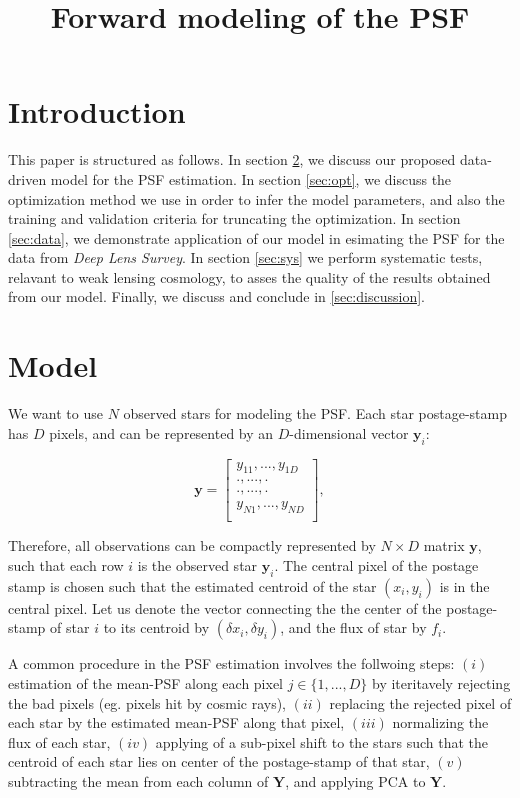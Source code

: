\documentclass[12pt,preprint]{aastex}
\newcommand{\beq}{\begin{equation}}
\newcommand{\eeq}{\end{equation}}
\begin{document}
\title{Forward modeling of the PSF}
\section{Introduction}

This paper is structured as follows. In section \ref{sec:model},
we discuss our proposed data-driven model for the PSF estimation.
In section \ref{sec:opt}, we discuss the optimization method
 we use in order to infer the model parameters, and also
 the training and validation criteria for 
truncating the optimization. In section \ref{sec:data},
 we demonstrate application of our model in esimating
 the PSF for the data from \emph{Deep Lens Survey}. 
In section \ref{sec:sys} we perform systematic tests,
 relavant to weak lensing cosmology, 
to asses the quality of the results obtained from our model. 
Finally, we discuss and conclude in \ref{sec:discussion}.               

\section{Model}\label{sec:model}

We want to use $N$ observed stars for modeling the PSF. 
Each star postage-stamp has $D$ pixels, 
and can be represented by an $D$-dimensional vector 
$\mathbf{y}_{i}$:

\beq
\mathbf{y}=
  \begin{bmatrix}
    y_{11}, ... , y_{1D} \\
    ., ... , . \\
    ., ... , . \\
    y_{N1}, ... , y_{ND} \\
  \end{bmatrix},
\eeq

Therefore, all observations can be compactly represented by 
$N\times D$ matrix $\mathbf{y}$, such that each row $i$ 
is the observed star $\mathbf{y}_{i}$. The central pixel of 
the postage stamp is chosen such that the estimated centroid
of the star $(x_i , y_i)$ is in the central pixel. 
Let us denote the vector connecting the the center of the 
postage-stamp of star $i$ to its centroid by $(\delta x_{i},
\delta y_{i})$, and the flux of star by $f_{i}$. 
  
A common procedure in the PSF estimation involves the follwoing steps:
$(i)$ estimation of the mean-PSF along each pixel $j\in\{1,...,D\}$
by iteritavely rejecting the bad pixels (eg. pixels hit by cosmic rays),
 $(ii)$ replacing the rejected pixel of each star by the estimated mean-PSF 
along that pixel, $(iii)$ normalizing the flux of each star,
 $(iv)$ applying of a sub-pixel shift
to the stars such that the centroid of each star lies on center 
of the postage-stamp of that star, $(v)$ subtracting the mean from each
column of $\mathbf{Y}$, and applying PCA to $\mathbf{Y}$.
\end{document}
